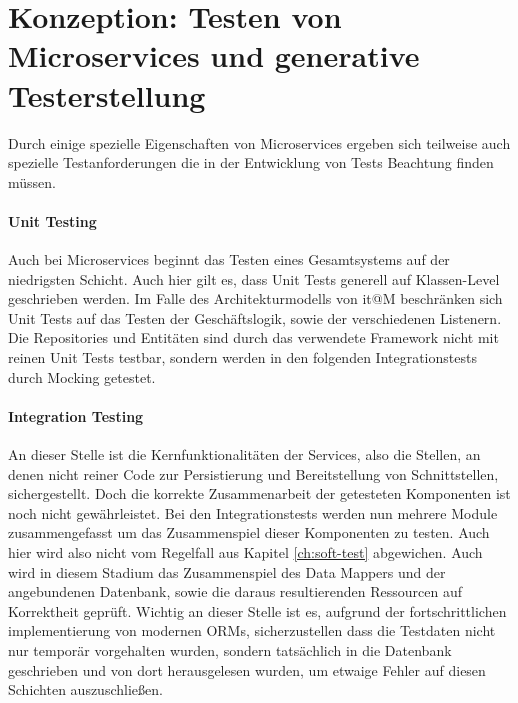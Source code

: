\documentclass[12pt,a4paper,bibliography=totocnumbered,listof=totocnumbered]{scrartcl}
\begin{document}
\section{Konzeption: Testen von Microservices und generative Testerstellung}\label{ch:ms-test}
\label{sec:testingms}

Durch einige spezielle Eigenschaften von Microservices ergeben sich teilweise auch spezielle Testanforderungen die in der Entwicklung von Tests Beachtung finden müssen. 


\paragraph{Unit Testing}

Auch bei Microservices beginnt das Testen eines Gesamtsystems auf der niedrigsten Schicht. Auch hier gilt es, dass Unit Tests generell auf Klassen-Level geschrieben werden.\cite{clemson} Im Falle des Architekturmodells von it@M beschränken sich Unit Tests auf das Testen der Geschäftslogik, sowie der verschiedenen Listenern. Die Repositories und Entitäten sind durch das verwendete Framework nicht mit reinen Unit Tests testbar, sondern werden in den folgenden Integrationstests durch Mocking getestet.


\paragraph{Integration Testing}

An dieser Stelle ist die Kernfunktionalitäten der Services, also die Stellen, an denen nicht reiner Code zur Persistierung und Bereitstellung von Schnittstellen, sichergestellt. Doch die korrekte Zusammenarbeit der getesteten Komponenten ist noch nicht gewährleistet. Bei den Integrationstests werden nun mehrere Module zusammengefasst um das Zusammenspiel dieser Komponenten zu testen.\cite{clemson} Auch hier wird also nicht vom Regelfall aus Kapitel \ref{ch:soft-test} abgewichen. Auch wird in diesem Stadium das Zusammenspiel des Data Mappers und der angebundenen Datenbank, sowie die daraus resultierenden Ressourcen auf Korrektheit geprüft. Wichtig an dieser Stelle ist es, aufgrund der fortschrittlichen implementierung von modernen \acp{ORM}, sicherzustellen dass die Testdaten nicht nur temporär vorgehalten wurden, sondern tatsächlich in die Datenbank geschrieben und von dort herausgelesen wurden, um etwaige Fehler auf diesen Schichten auszuschließen.\cite{clemson}
\end{document}
